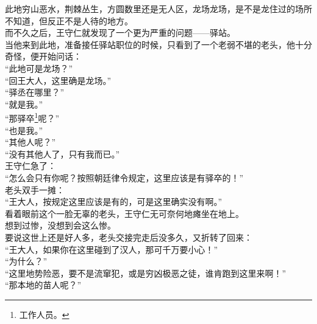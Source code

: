 \begin{multicols}{\theparacolNo}
此地穷山恶水，荆棘丛生，方圆数里还是无人区，龙场龙场，是不是龙住过的场所不知道，但反正不是人待的地方。\\

而不久之后，王守仁就发现了一个更为严重的问题——驿站。\\

当他来到此地，准备接任驿站职位的时候，只看到了一个老弱不堪的老头，他十分奇怪，便开始问话：\\

“此地可是龙场？”\\

“回王大人，这里确是龙场。”\\

“驿丞在哪里？”\\

“就是我。”\\

“那驿卒\footnote{工作人员。}呢？”\\

“也是我。”\\

“其他人呢？”\\

“没有其他人了，只有我而已。”\\

王守仁急了：\\

“怎么会只有你呢？按照朝廷律令规定，这里应该是有驿卒的！”\\

老头双手一摊：\\

“王大人，按规定这里应该是有的，可是这里确实没有啊。”\\

看着眼前这个一脸无辜的老头，王守仁无可奈何地瘫坐在地上。\\

想到过惨，没想到会这么惨。\\

要说这世上还是好人多，老头交接完走后没多久，又折转了回来：\\

“王大人，如果你在这里碰到了汉人，那可千万要小心！”\\

“为什么？”\\

“这里地势险恶，要不是流窜犯，或是穷凶极恶之徒，谁肯跑到这里来啊！”\\

“那本地的苗人呢？”\\


\end{multicols}
